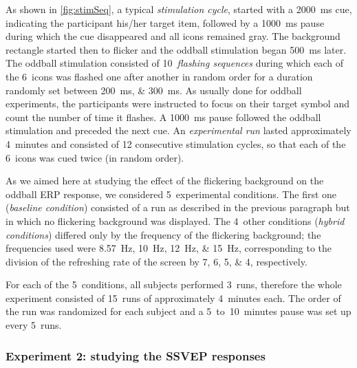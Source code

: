 \documentclass[10pt]{article}
\begin{document}
        As shown in \autoref{fig:stimSeq}, a typical \emph{stimulation cycle}, started with a \SI{2000}{\ms} cue, indicating the participant his/her target item, followed by a \SI{1000}{\ms} pause during which the cue disappeared and all icons remained gray.
        The background rectangle started then to flicker and the oddball stimulation began \SI{500}{\ms} later.
        The oddball stimulation consisted of 10~\emph{flashing sequences} during which each of the 6~icons was flashed one after another in random order for a duration randomly set between \SIlist[list-units = single]{200;300}{\ms}.
        As usually done for oddball experiments, the participants were instructed to focus on their target symbol and count the number of time it flashes.
        A \SI{1000}{\ms} pause followed the oddball stimulation and preceded the next cue.
        An \emph{experimental run} lasted approximately 4~minutes and consisted of 12 consecutive stimulation cycles, so that each of the 6~icons was cued twice (in random order).

        As we aimed here at studying the effect of the flickering background on the oddball \ac{ERP} response, we considered 5~experimental conditions.
        The first one (\emph{baseline condition}) consisted of a run as described in the previous paragraph but in which no flickering background was displayed.
        The 4~other conditions (\emph{hybrid conditions}) differed only by the frequency of the flickering background; the frequencies used were \SIlist[list-units = single]{8.57;10;12;15}{\Hz}, corresponding to the division of the refreshing rate of the screen by \numlist{7;6;5;4}, respectively.

        For each of the 5~conditions, all subjects performed 3~runs, therefore the whole experiment consisted of 15~runs of approximately 4~minutes each.
        The order of the run was randomized for each subject and a 5~to~10~minutes pause was set up every 5~runs.


        \subsubsection{Experiment 2: studying the \acs{SSVEP} responses}
        \label{sec:2.2.2ProtocolSSVEP}
\end{document}
